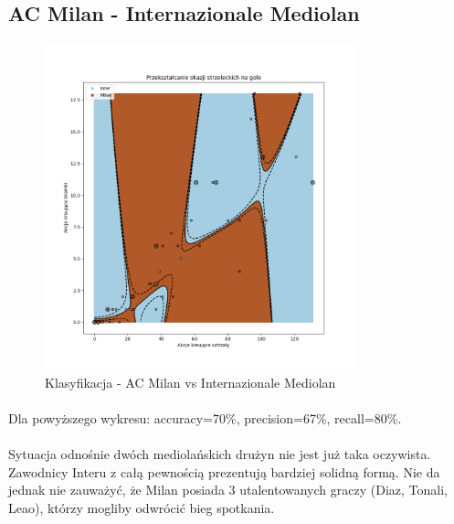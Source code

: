 \documentclass[12pt, letterpaper]{article}
\begin{document}
\subsection{AC Milan - Internazionale Mediolan}
\begin{figure}[ht]
    \centering
    \includegraphics[width=0.8\textwidth]{images/0706708MilanInter.png}
    \caption{Klasyfikacja - AC Milan vs Internazionale Mediolan}
    \label{fig:enter-label}
\end{figure}
\paragraph{} Dla powyższego wykresu: accuracy=70\%, precision=67\%, recall=80\%.
\paragraph{} Sytuacja odnośnie dwóch mediolańskich drużyn nie jest już taka oczywista. Zawodnicy Interu z całą pewnością prezentują bardziej solidną formą. Nie da jednak nie zauważyć, że Milan posiada 3 utalentowanych graczy (Diaz, Tonali, Leao), którzy mogliby odwrócić bieg spotkania.
\pagebreak
\end{document}
